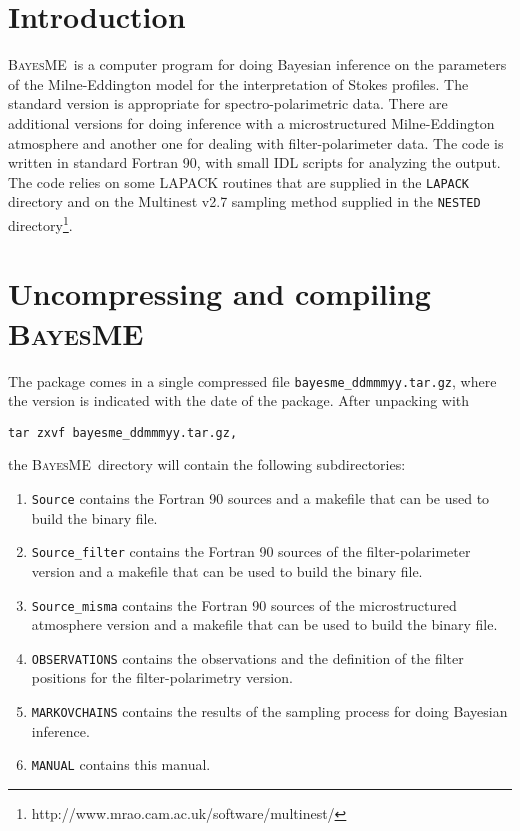 \documentclass[12pt]{article}
\def\B{\textsc{BayesME}}
\begin{document}
\newpage

\section{Introduction}

\B\ is a computer program for doing Bayesian inference on the
parameters of the Milne-Eddington model for the interpretation of
Stokes profiles. The standard version is appropriate for spectro-polarimetric
data. There are additional versions for doing inference with a 
microstructured Milne-Eddington atmosphere and another one for dealing
with filter-polarimeter data. The code is written in standard Fortran 90, with small IDL
scripts for analyzing the output. The code relies on some LAPACK routines that
are supplied in the \texttt{LAPACK} directory and on the Multinest v2.7 sampling
method supplied in the \texttt{NESTED} directory\footnote{http://www.mrao.cam.ac.uk/software/multinest/}. 

\section{Uncompressing and compiling \B}

The package comes in a single compressed file \texttt{bayesme\_ddmmmyy.tar.gz}, where
the version is indicated with the date of the package. After
unpacking with 
\begin{verbatim}
tar zxvf bayesme_ddmmmyy.tar.gz, 
\end{verbatim}
the \B\ directory
will contain the following subdirectories:

\begin{enumerate}
\item
{\tt Source} contains the Fortran 90 sources and a makefile that can be used
to build the binary file.
\item
{\tt Source\_filter} contains the Fortran 90 sources of the filter-polarimeter version and a makefile that can be used
to build the binary file.
\item
{\tt Source\_misma} contains the Fortran 90 sources of the microstructured atmosphere version and a makefile that can be used
to build the binary file.
\item
{\tt OBSERVATIONS} contains the observations and the definition of the filter
positions for the filter-polarimetry version.
\item
{\tt MARKOVCHAINS} contains the results of the sampling process for doing
Bayesian inference.
\item
{\tt MANUAL} contains this manual. 
\end{enumerate}
\end{document}
